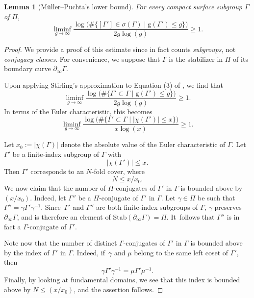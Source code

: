 \documentclass[10pt]{amsart}
\theoremstyle{plain}
\newtheorem{lemma}[theorem]{Lemma}
\theoremstyle{definition}
\begin{document}
\begin{lemma}[Müller--Puchta's lower bound]\label{l.Muller_Puchta}
For every compact surface subgroup $\Gamma$ of $\Pi$,
\begin{equation}\label{eq.lower_bound_MP}
\liminf_{g\to\infty}\frac{\log\bigl(\#\{[\Gamma']\in\sigma(\Gamma)\mid \mathrm{g}(\Gamma')\leq g\}\bigr)}{2g\log(g)} \geq 1.
\end{equation}
\end{lemma}

\begin{proof}
We provide a proof of this estimate since \cite{Muller_Puchta} in fact counts \emph{subgroups}, not \emph{conjugacy classes}. For convenience, we suppose that $\Gamma$ is the stabilizer in $\Pi$ of its boundary curve $\partial_\infty\Gamma$.

Upon applying Stirling's approximation to Equation (3) of \cite{Muller_Puchta}, we find that
\begin{equation*}
\liminf_{g\to\infty}\frac{\log\bigl(\#\{\Gamma'\subset\Gamma\mid \mathrm{g}(\Gamma')\leq g\}\bigr)}{2g\log(g)} \geq 1.
\end{equation*}
In terms of the Euler characteristic, this becomes
\begin{equation*}
\liminf_{g\to\infty}\frac{\log\bigl(\#\{\Gamma'\subset\Gamma\mid \left|\chi(\Gamma')\right|\leq x\}\bigr)}{x\log(x)} \geq 1.
\end{equation*}

Let $x_0:=\left|\chi(\Gamma)\right|$ denote the absolute value of the Euler characteristic of $\Gamma$. Let $\Gamma'$ be a finite-index subgroup of $\Gamma$ with
\begin{equation*}
\left|\chi(\Gamma')\right| \leq x.
\end{equation*}
Then $\Gamma'$ corresponds to an $N$-fold cover, where
\begin{equation*}
N\leq x/x_0.
\end{equation*}
We now claim that the number of $\Pi$-conjugates of $\Gamma'$ in $\Gamma$ is bounded above by $(x/x_0)$. Indeed, let $\Gamma''$ be a $\Pi$-conjugate of $\Gamma'$ in $\Gamma$. Let $\gamma\in\Pi$ be such that $\Gamma''=\gamma\Gamma'\gamma^{-1}$. Since~$\Gamma'$ and $\Gamma''$ are both finite-index subgroups of $\Gamma$, $\gamma$ preserves $\partial_\infty\Gamma$, and is therefore an element of $\mathrm{Stab}(\partial_\infty\Gamma)=\Pi$. It~follows that $\Gamma''$ is in fact a $\Gamma$-conjugate of $\Gamma'$.

Note now that the number of distinct $\Gamma$-conjugates of $\Gamma'$ in $\Gamma$ is bounded above by the index of $\Gamma'$ in $\Gamma$. Indeed, if~$\gamma$ and $\mu$ belong to the same left coset of $\Gamma'$, then
\begin{equation*}
\gamma\Gamma'\gamma^{-1} = \mu\Gamma'\mu^{-1}.
\end{equation*}
Finally, by looking at fundamental domains, we see that this index is bounded above by $N\leq (x/x_0)$, and the assertion follows.


\end{proof}
\end{document}
